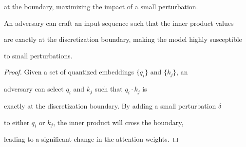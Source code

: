 at the boundary, maximizing the impact of a small perturbation.













\begin{lemma}






An adversary can craft an input sequence such that the inner product values






are exactly at the discretization boundary, making the model highly susceptible






to small perturbations.






\end{lemma}













\begin{proof}






Given a set of quantized embeddings \( \{ q_i \} \) and \( \{ k_j \} \), an






adversary can select \( q_i \) and \( k_j \) such that \( q_i \cdot k_j \) is






exactly at the discretization boundary. By adding a small perturbation \( \delta \)






to either \( q_i \) or \( k_j \), the inner product will cross the boundary,






leading to a significant change in the attention weights.






\end{proof}













